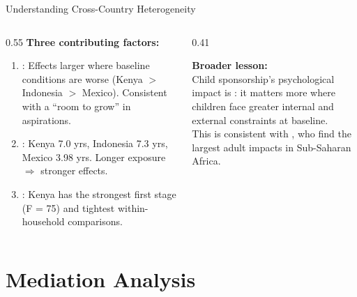 \documentclass[aspectratio=169, 10pt]{beamer}
\begin{document}
\begin{frame}{Understanding Cross-Country Heterogeneity}
  \begin{columns}
    \begin{column}{0.55\textwidth}
      \textbf{Three contributing factors:}
      \vspace{0.3em}
      \begin{enumerate}
        \item {}: Effects larger where baseline conditions are worse (Kenya $>$ Indonesia $>$ Mexico). Consistent with a ``room to grow'' in aspirations.

        \vspace{0.3em}
        \item {}: Kenya 7.0 yrs, Indonesia 7.3 yrs, Mexico 3.98 yrs. Longer exposure $\Rightarrow$ stronger effects.

        \vspace{0.3em}
        \item {}: Kenya has the strongest first stage (F = 75) and tightest within-household comparisons.
      \end{enumerate}
    \end{column}
    \begin{column}{0.41\textwidth}
      \begin{keybox}
        \textbf{Broader lesson:}\\[0.4em]
        Child sponsorship's psychological impact is : it matters more where children face greater internal and external constraints at baseline.\\[0.5em]
        This is consistent with \citealt{Wydick2013}, who find the largest adult impacts in Sub-Saharan Africa.
      \end{keybox}
    \end{column}
  \end{columns}
\end{frame}

\section{Mediation Analysis}
\end{document}
